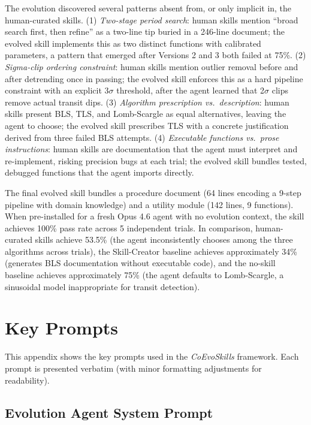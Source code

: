 \documentclass{article}
\newcommand{\method}{\textit{CoEvoSkills}\xspace}
\begin{document}
The evolution discovered several patterns absent from, or only implicit in, the human-curated skills. (1) \emph{Two-stage period search}: human skills mention ``broad search first, then refine'' as a two-line tip buried in a 246-line document; the evolved skill implements this as two distinct functions with calibrated parameters, a pattern that emerged after Versions 2 and 3 both failed at 75\%. (2) \emph{Sigma-clip ordering constraint}: human skills mention outlier removal before and after detrending once in passing; the evolved skill enforces this as a hard pipeline constraint with an explicit 3$\sigma$ threshold, after the agent learned that 2$\sigma$ clips remove actual transit dips. (3) \emph{Algorithm prescription vs.\ description}: human skills present BLS, TLS, and Lomb-Scargle as equal alternatives, leaving the agent to choose; the evolved skill prescribes TLS with a concrete justification derived from three failed BLS attempts. (4) \emph{Executable functions vs.\ prose instructions}: human skills are documentation that the agent must interpret and re-implement, risking precision bugs at each trial; the evolved skill bundles tested, debugged functions that the agent imports directly.

The final evolved skill bundles a procedure document (64 lines encoding a 9-step pipeline with domain knowledge) and a utility module (142 lines, 9 functions). When pre-installed for a fresh Opus 4.6 agent with no evolution context, the skill achieves 100\% pass rate across 5 independent trials. In comparison, human-curated skills achieve 53.5\% (the agent inconsistently chooses among the three algorithms across trials), the Skill-Creator baseline achieves approximately 34\% (generates BLS documentation without executable code), and the no-skill baseline achieves approximately 75\% (the agent defaults to Lomb-Scargle, a sinusoidal model inappropriate for transit detection).


\section{Key Prompts}
\label{app:prompts}

This appendix shows the key prompts used in the \method framework. Each prompt is presented verbatim (with minor formatting adjustments for readability).

\subsection{Evolution Agent System Prompt}
\end{document}
